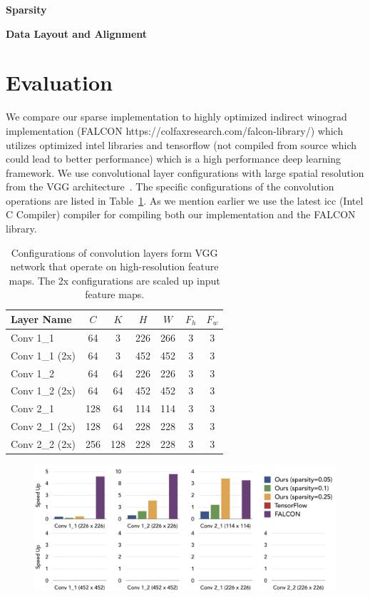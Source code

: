 \documentclass{article}
\begin{document}
\textbf{Sparsity}

\textbf{Data Layout and Alignment}

\section{Evaluation}
We compare our sparse implementation to highly optimized indirect winograd
implementation (FALCON https://colfaxresearch.com/falcon-library/) which
utilizes optimized intel libraries and tensorflow (not compiled from source
which could lead to better performance) which is a high performance deep
learning framework.  We use convolutional layer configurations with large
spatial resolution from the VGG architecture~\cite{simonyan2014very}. The
specific configurations of the convolution operations are listed in
Table~\ref{tab:conv_config}. As we mention earlier we use the latest icc (Intel
C Compiler) compiler for compiling both our implementation and the FALCON
library. 

\begin{table}[h]\centering
\small
\begin{tabularx}{0.75\textwidth}{Xcccccc}\toprule
    Layer Name & $C$ & $K$ & $H$ & $W$ & $F_h$ & $F_w$\\ \midrule 
    Conv 1\_1 & 64 & 3 & 226 & 266 & 3  & 3 \\
    Conv 1\_1 (2x) & 64 & 3 & 452 & 452 & 3  & 3 \\
    Conv 1\_2  & 64 & 64 & 226 & 226 & 3  & 3 \\
    Conv 1\_2 (2x) & 64 & 64 & 452 & 452 & 3  & 3 \\
    Conv 2\_1  & 128 & 64 & 114 & 114 & 3  & 3 \\
    Conv 2\_1 (2x) & 128 & 64 & 228 & 228 & 3  & 3 \\
    Conv 2\_2 (2x) & 256 & 128 & 228 & 228 & 3  & 3 \\
    \bottomrule
\end{tabularx}
    \vspace{1em}
    \caption{Configurations of convolution layers form VGG network that operate
    on high-resolution feature maps. The 2x configurations are scaled up input
    feature maps.}
\label{tab:conv_config}
\end{table}


\begin{figure}[t]
	\centering
	\includegraphics[width=\textwidth]{falcon_tf}
    \label{fig:falcon_tf}
\end{figure}
\end{document}

